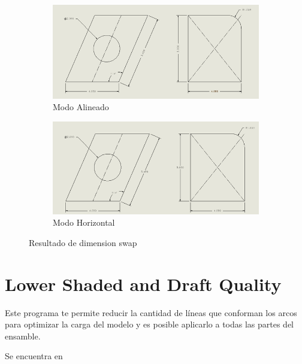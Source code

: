 \documentclass{report}
\begin{document}
\begin{figure}[H]
	\centering
	\begin{subfigure}[b]{0.45\textwidth}
		\includegraphics[width=\textwidth]{Imagenes/solidworks_macro_12}
		\caption{Modo Alineado}
		\label{fig:solidworksmacro12}
	\end{subfigure}
	\begin{subfigure}[b]{0.45\textwidth}
		\includegraphics[width=\textwidth]{Imagenes/solidworks_macro_13}
		\caption{Modo Horizontal}
		\label{fig:solidworksmacro13}
	\end{subfigure}
	\caption{Resultado de dimension swap}
\end{figure}


\section{Lower Shaded and Draft Quality}

Este programa te permite reducir la cantidad de líneas que conforman los arcos para optimizar la carga del modelo y es posible aplicarlo a todas las partes del ensamble.

Se encuentra en 
\end{document}
